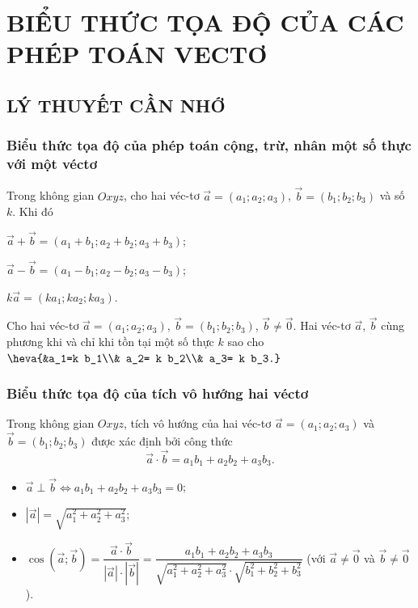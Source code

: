 \section{BIỂU THỨC TỌA ĐỘ CỦA CÁC PHÉP TOÁN VECTƠ}
\subsection{LÝ THUYẾT CẦN NHỚ}
\subsubsection{Biểu thức tọa độ của phép toán cộng, trừ, nhân một số thực với một véctơ}
Trong không gian $Oxyz$, cho hai véc-tơ $\vec{a} = (a_1;a_2;a_3)$, $\vec{b} = (b_1; b_2; b_3)$ và số $k$. Khi đó
\begin{gachsoc}
	\begin{listEX}[1]
		\item [\ding{172}] $\vec{a}+\vec{b}=(a_1+b_1;a_2+b_2;a_3+b_3)$;
		\item [\ding{173}] $\vec{a}-\vec{b}=(a_1-b_1;a_2-b_2;a_3-b_3)$;
		\item [\ding{174}] $k\vec{a} = (ka_1; ka_2; ka_3)$.
	\end{listEX}
\end{gachsoc}
\begin{luuy}
	Cho hai véc-tơ $\vec{a}=(a_1;a_2;a_3)$, $\vec{b}=(b_1;b_2;b_3)$, $\vec{b}\ne \vec{0}$. Hai véc-tơ $\vec{a}$, $\vec{b}$ cùng phương khi và chỉ khi tồn tại một số thực $k$ sao cho $\heva{&a_1=k b_1\\& a_2= k b_2\\& a_3= k b_3.}$
\end{luuy}
\subsubsection{Biểu thức tọa độ của tích vô hướng hai véctơ}
Trong không gian $Oxyz$, tích vô hướng của hai véc-tơ $\vec{a} = (a_1;a_2;a_3)$ và $\vec{b} = (b_1; b_2; b_3)$ được xác định bởi công thức
\[\vec{a} \cdot \vec{b} = a_1b_1 + a_2b_2 + a_3b_3. \]
\begin{note}
	\begin{itemize}
		\item[\ding{172}] $\vec{a} \perp \vec{b} \Leftrightarrow a_1b_1 + a_2b_2 + a_3b_3 = 0$;
		\item[\ding{173}] $\left| \vec{a} \right| = \sqrt{a_1^2 + a_2^2 +a_3^2}$;
		\item[\ding{174}] $\cos \left(\vec{a}; \vec{b}\right) = \dfrac{\vec{a}\cdot \vec{b}}{\left|\vec{a}\right| \cdot \left|\vec{b}\right|} = \dfrac{a_1b_1 + a_2b_2 + a_3b_3}{\sqrt{a_1^2 + a_2^2 +a_3^2} \cdot \sqrt{b_1^2 + b_2^2 +b_3^2}}$ (với $\vec{a} \ne \vec{0}$ và $\vec{b} \ne \vec{0}$).
	\end{itemize}
\end{note}
